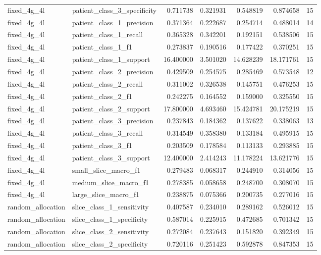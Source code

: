 \begin{tabular}{llrrrrr}
fixed_4g_4l & patient_class_3_specificity & 0.711738 & 0.321931 & 0.548819 & 0.874658 & 15 \\
fixed_4g_4l & patient_class_1_precision & 0.371364 & 0.222687 & 0.254714 & 0.488014 & 14 \\
fixed_4g_4l & patient_class_1_recall & 0.365328 & 0.342201 & 0.192151 & 0.538506 & 15 \\
fixed_4g_4l & patient_class_1_f1 & 0.273837 & 0.190516 & 0.177422 & 0.370251 & 15 \\
fixed_4g_4l & patient_class_1_support & 16.400000 & 3.501020 & 14.628239 & 18.171761 & 15 \\
fixed_4g_4l & patient_class_2_precision & 0.429509 & 0.254575 & 0.285469 & 0.573548 & 12 \\
fixed_4g_4l & patient_class_2_recall & 0.311002 & 0.326538 & 0.145751 & 0.476253 & 15 \\
fixed_4g_4l & patient_class_2_f1 & 0.242275 & 0.164552 & 0.159000 & 0.325550 & 15 \\
fixed_4g_4l & patient_class_2_support & 17.800000 & 4.693460 & 15.424781 & 20.175219 & 15 \\
fixed_4g_4l & patient_class_3_precision & 0.237843 & 0.184362 & 0.137622 & 0.338063 & 13 \\
fixed_4g_4l & patient_class_3_recall & 0.314549 & 0.358380 & 0.133184 & 0.495915 & 15 \\
fixed_4g_4l & patient_class_3_f1 & 0.203509 & 0.178584 & 0.113133 & 0.293885 & 15 \\
fixed_4g_4l & patient_class_3_support & 12.400000 & 2.414243 & 11.178224 & 13.621776 & 15 \\
fixed_4g_4l & small_slice_macro_f1 & 0.279483 & 0.068317 & 0.244910 & 0.314056 & 15 \\
fixed_4g_4l & medium_slice_macro_f1 & 0.278385 & 0.058658 & 0.248700 & 0.308070 & 15 \\
fixed_4g_4l & large_slice_macro_f1 & 0.238875 & 0.075366 & 0.200735 & 0.277016 & 15 \\
random_allocation & slice_class_1_sensitivity & 0.407587 & 0.234010 & 0.289162 & 0.526012 & 15 \\
random_allocation & slice_class_1_specificity & 0.587014 & 0.225915 & 0.472685 & 0.701342 & 15 \\
random_allocation & slice_class_2_sensitivity & 0.272084 & 0.237643 & 0.151820 & 0.392349 & 15 \\
random_allocation & slice_class_2_specificity & 0.720116 & 0.251423 & 0.592878 & 0.847353 & 15 \\

\end{tabular}

